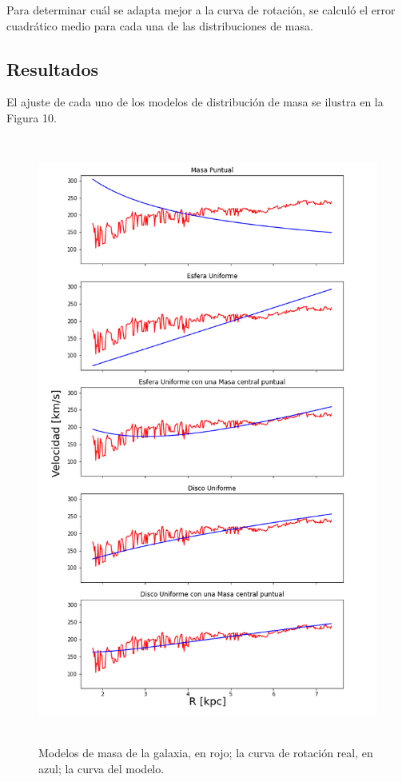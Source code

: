 \documentclass[letterpaper,oneside]{article}
\begin{document}
Para determinar cuál se adapta mejor a la curva de rotación, se calculó el error cuadrático medio para cada una de las distribuciones de masa.

\subsection{Resultados}
El ajuste de cada uno de los modelos de distribución de masa se ilustra en la Figura 10.

\begin{figure}
  \centering
  \includegraphics[height=20cm]{../graficos/modelos.png}
  \caption{Modelos de masa de la galaxia, en rojo; la curva de rotación real, en azul; la curva del modelo.}
\end{figure}
\end{document}
